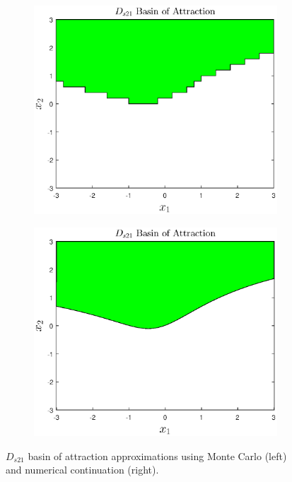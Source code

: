 \documentclass[12pt]{article}
\begin{document}
\begin{figure}[H]
\centering
\begin{subfigure}[b]{0.45\textwidth}
	\centering
	\includegraphics[width=\textwidth]{basin_MC.eps}
\end{subfigure}
\quad 
\begin{subfigure}[b]{0.45\textwidth}
	\centering
	\includegraphics[width=\textwidth]{basin_NM.eps}
\end{subfigure}
\caption{$D_{s21}$ basin of attraction approximations using Monte Carlo (left) and numerical continuation (right).}
\label{basins_compare}
\end{figure}
\end{document}
